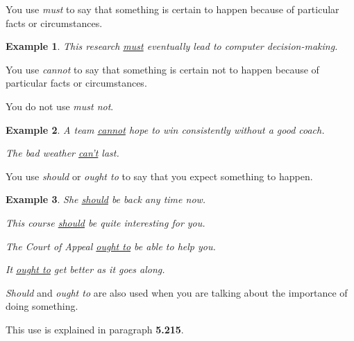 \documentclass[oneside]{book}
\numberwithin{equation}{section}
\newtheorem{example}{Example}[section]
\begin{document}
%
You use \textit{must} to say that something is certain to happen because of particular facts or circumstances.
\begin{example}
    This research \underline{must} eventually lead to computer decision-making.
\end{example}
You use \textit{cannot} to say that something is certain not to happen because of particular facts or circumstances.

You do not use \textit{must not}.
\begin{example}
    A team \underline{cannot} hope to win consistently without a good coach.
    
    The bad weather \underline{can't} last.
\end{example}
%
\noindent{} You use \textit{should} or \textit{ought to} to say that you expect something to happen.
\begin{example}
    She \underline{should} be back any time now.
    
    This course \underline{should} be quite interesting for you.
    
    The Court of Appeal \underline{ought to} be able to help you.
    
    It \underline{ought to} get better as it goes along.
\end{example}
\textit{Should} and \textit{ought to} are also used when you are talking about the importance of doing something.

This use is explained in paragraph \textbf{5.215}.
\end{document}
